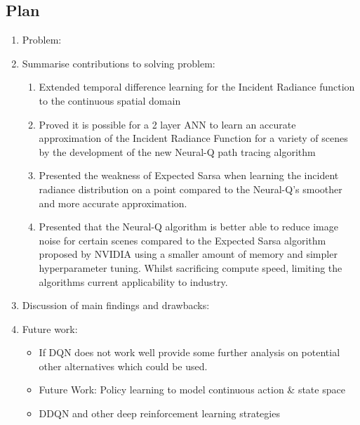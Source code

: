 \documentclass[../dissertation.tex]{subfiles}
\begin{document}
\subsection{Plan}
\begin{enumerate}

\item Problem:

\item Summarise contributions to solving problem:
\begin{enumerate}
\item Extended temporal difference learning for the Incident Radiance function to the continuous spatial domain 

\item Proved it is possible for a 2 layer ANN to learn an accurate approximation of the Incident Radiance Function for a variety of scenes by the development of the new Neural-Q path tracing algorithm

\item Presented the weakness of Expected Sarsa when learning the incident radiance distribution on a point compared to the Neural-Q's smoother and more accurate approximation.

\item Presented that the Neural-Q algorithm is better able to reduce image noise for certain scenes compared to the Expected Sarsa algorithm proposed by NVIDIA using a smaller amount of memory and simpler hyperparameter tuning. Whilst sacrificing compute speed, limiting the algorithms current applicability to industry.
\end{enumerate}

\item Discussion of main findings and drawbacks:

\item Future work:

\begin{itemize}
\item If DQN does not work well provide some further analysis on potential other alternatives which could be used.

\item Future Work: Policy learning to model continuous action \& state space

\item DDQN and other deep reinforcement learning strategies
\end{itemize}
\end{enumerate}
\end{document}
